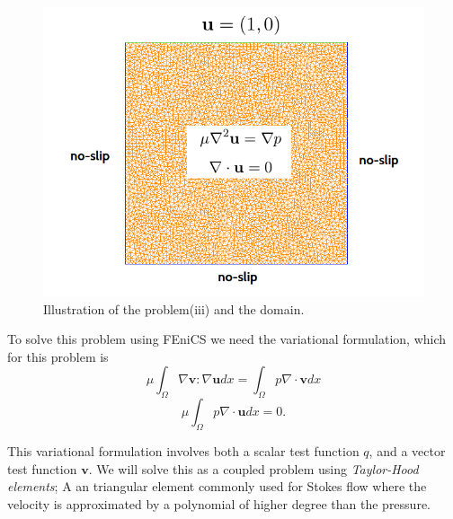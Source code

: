 \documentclass[11pt,a4paper,english]{article}
\numberwithin{equation}{section}
\begin{document}
\begin{figure}[h!]
\begin{center}
  \includegraphics[scale=0.3]{stokes_square.png}
  \end{center}
  \caption{Illustration of the problem(iii) and the domain.}
  \label{fig:stokes_square}
\end{figure}

To solve this problem using FEniCS we need the variational formulation, which for this problem is
\begin{equation}
\mu \int_\Omega \nabla \mathbf{v}:\nabla \mathbf{u} dx = \int_\Omega p \nabla \cdot \mathbf{v} dx 
\end{equation}
\begin{equation}
\mu \int_\Omega p\nabla \cdot \mathbf{u} dx = 0.
\end{equation}

This variational formulation involves both a scalar test function $q$, and a vector test function $\mathbf{v}$. We will solve this as a coupled problem using \emph{Taylor-Hood elements}; A an triangular element commonly used for Stokes flow where the velocity is approximated by a polynomial of higher degree than the pressure. 
\end{document}
